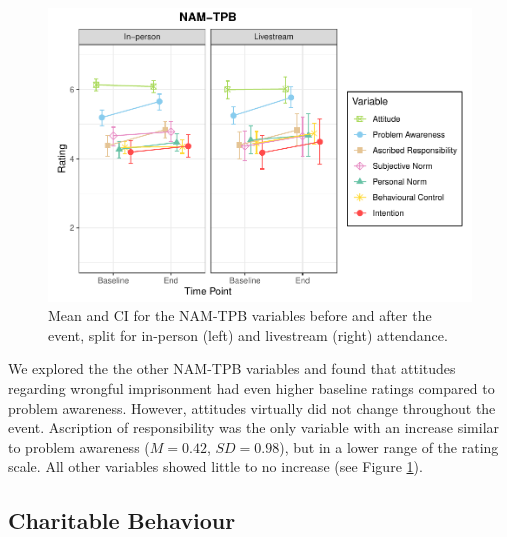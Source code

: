 \documentclass[
  man,floatsintext]{apa6}
\begin{document}
\begin{figure}
\includegraphics[width=1\linewidth]{Schlichting_MSc_Thesis_files/figure-latex/namtpb-lineplots-1} \caption{Mean and CI for the NAM-TPB variables before and after the event, split for in-person (left) and livestream (right) attendance.}\label{fig:namtpb-lineplots}
\end{figure}

We explored the the other NAM-TPB variables and found that attitudes regarding wrongful imprisonment had even higher baseline ratings compared to problem awareness. However, attitudes virtually did not change throughout the event. Ascription of responsibility was the only variable with an increase similar to problem awareness (\(M = 0.42\), \(SD = 0.98\)), but in a lower range of the rating scale. All other variables showed little to no increase (see Figure \ref{fig:namtpb-lineplots}).

\subsection{Charitable Behaviour}\label{charitable-behaviour}
\end{document}
